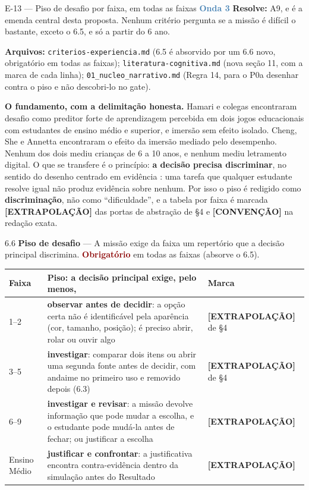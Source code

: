 \documentclass[11pt,a4paper]{article}
\newcommand{\obrig}{\textcolor{DarkRed}{\textbf{Obrigatório}}}
\newcommand{\onda}[1]{\textcolor{SteelBlue}{\textbf{Onda #1}}}
\newcommand{\extrap}{\textbf{[EXTRAPOLAÇÃO]}}
\newcommand{\conv}{\textbf{[CONVENÇÃO]}}
\begin{document}
\begin{emendabox}{E-13 --- Piso de desafio por faixa, em todas as faixas \hfill \onda{3}}
\textbf{Resolve:} A9, e é a emenda central desta proposta. Nenhum critério pergunta se a missão é
difícil o bastante, exceto o 6.5, e só a partir do 6\textordmasculine{} ano.

\textbf{Arquivos:} \texttt{criterios-experiencia.md} (6.5 é absorvido por um 6.6 novo, obrigatório
em todas as faixas); \texttt{literatura-cognitiva.md} (nova seção 11, com a marca de cada linha);
\texttt{01\_nucleo\_narrativo.md} (Regra 14, para o P0a desenhar contra o piso e não descobri-lo no
gate).

\textbf{O fundamento, com a delimitação honesta.} Hamari e colegas \cite{hamari2016} encontraram
desafio como preditor forte de aprendizagem percebida em dois jogos educacionais com estudantes de
ensino médio e superior, e imersão sem efeito isolado. Cheng, She e Annetta \cite{cheng2015}
encontraram o efeito da imersão mediado pelo desempenho. Nenhum dos dois mediu crianças de 6 a 10
anos, e nenhum mediu letramento digital. O que se transfere é o princípio: \textbf{a decisão
precisa discriminar}, no sentido do desenho centrado em evidência \cite{mislevy2003}: uma tarefa
que qualquer estudante resolve igual não produz evidência sobre nenhum. Por isso o piso é
redigido como \textbf{discriminação}, não como ``dificuldade'', e a tabela por faixa é marcada
\extrap{} das portas de abstração de \S4 e \conv{} na redação exata.

\begin{depoisbox}\small
6.6 \textbf{Piso de desafio} --- A missão exige da faixa um repertório que a decisão principal
discrimina. \obrig{} em todas as faixas (absorve o 6.5).

\begin{center}
\begin{tabular}{@{}p{1.9cm} p{7.4cm} p{2.3cm}@{}}
\toprule
\textbf{Faixa} & \textbf{Piso: a decisão principal exige, pelo menos,} & \textbf{Marca} \\
\midrule
1\textordmasculine{}--2\textordmasculine{} & \textbf{observar antes de decidir}: a opção certa não
é identificável pela aparência (cor, tamanho, posição); é preciso abrir, rolar ou ouvir algo &
\extrap{} de \S4 \\
3\textordmasculine{}--5\textordmasculine{} & \textbf{investigar}: comparar dois itens ou abrir uma
segunda fonte antes de decidir, com andaime no primeiro uso e removido depois (6.3) &
\extrap{} de \S4 \\
6\textordmasculine{}--9\textordmasculine{} & \textbf{investigar e revisar}: a missão devolve
informação que pode mudar a escolha, e o estudante pode mudá-la antes de fechar; ou justificar a
escolha & \extrap{} \\
Ensino Médio & \textbf{justificar e confrontar}: a justificativa encontra contra-evidência dentro
da simulação antes do Resultado & \extrap{} \\
\bottomrule
\end{tabular}
\end{center}


\end{depoisbox}
\end{emendabox}
\end{document}
